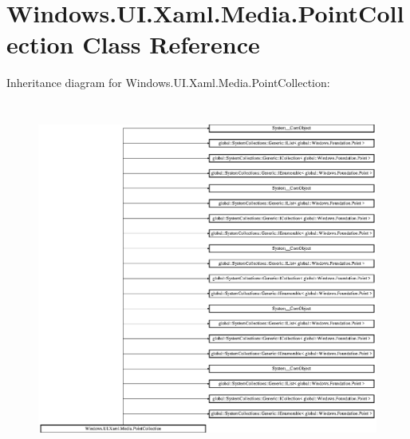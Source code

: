 \hypertarget{class_windows_1_1_u_i_1_1_xaml_1_1_media_1_1_point_collection}{}\section{Windows.\+U\+I.\+Xaml.\+Media.\+Point\+Collection Class Reference}
\label{class_windows_1_1_u_i_1_1_xaml_1_1_media_1_1_point_collection}
Inheritance diagram for Windows.\+U\+I.\+Xaml.\+Media.\+Point\+Collection\+:\begin{figure}[H]
\begin{center}
\leavevmode
\includegraphics[height=11.713147cm]{class_windows_1_1_u_i_1_1_xaml_1_1_media_1_1_point_collection}
\end{center}
\end{figure}
